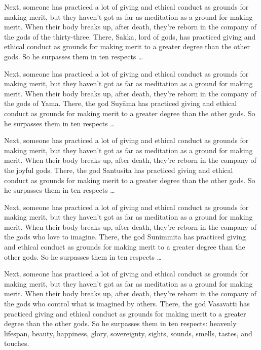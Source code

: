 \documentclass[12pt,openany]{book}%
\begin{document}
Next, someone has practiced a lot of giving and ethical conduct as grounds for making merit, but they haven’t got as far as meditation as a ground for making merit. When their body breaks up, after death, they’re reborn in the company of the gods of the thirty-three. There, Sakka, lord of gods, has practiced giving and ethical conduct as grounds for making merit to a greater degree than the other gods. So he surpasses them in ten respects … 

Next, someone has practiced a lot of giving and ethical conduct as grounds for making merit, but they haven’t got as far as meditation as a ground for making merit. When their body breaks up, after death, they’re reborn in the company of the gods of Yama. There, the god \textsanskrit{Suyāma} has practiced giving and ethical conduct as grounds for making merit to a greater degree than the other gods. So he surpasses them in ten respects … 

Next, someone has practiced a lot of giving and ethical conduct as grounds for making merit, but they haven’t got as far as meditation as a ground for making merit. When their body breaks up, after death, they’re reborn in the company of the joyful gods. There, the god Santusita has practiced giving and ethical conduct as grounds for making merit to a greater degree than the other gods. So he surpasses them in ten respects … 

Next, someone has practiced a lot of giving and ethical conduct as grounds for making merit, but they haven’t got as far as meditation as a ground for making merit. When their body breaks up, after death, they’re reborn in the company of the gods who love to imagine. There, the god Sunimmita has practiced giving and ethical conduct as grounds for making merit to a greater degree than the other gods. So he surpasses them in ten respects … 

Next, someone has practiced a lot of giving and ethical conduct as grounds for making merit, but they haven’t got as far as meditation as a ground for making merit. When their body breaks up, after death, they’re reborn in the company of the gods who control what is imagined by others. There, the god \textsanskrit{Vasavattī} has practiced giving and ethical conduct as grounds for making merit to a greater degree than the other gods. So he surpasses them in ten respects: heavenly lifespan, beauty, happiness, glory, sovereignty, sights, sounds, smells, tastes, and touches. 
\end{document}
